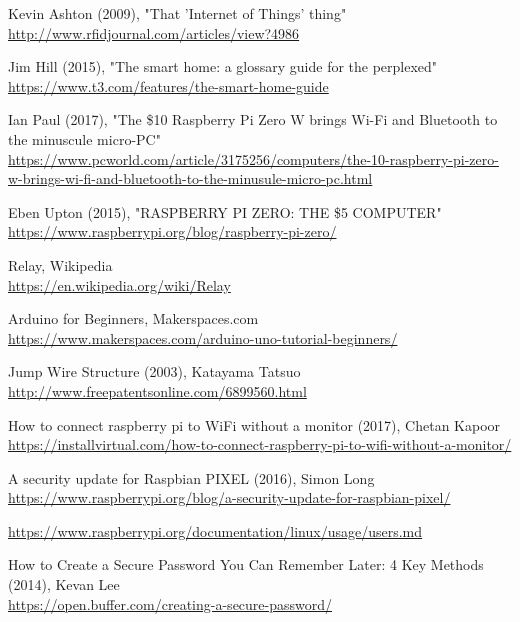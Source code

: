 \begin{thebibliography}{99}

Kevin Ashton (2009), "That 'Internet of Things' thing"\\
\url{http://www.rfidjournal.com/articles/view?4986}

Jim Hill (2015), "The smart home: a glossary guide for the perplexed"\\
\url{https://www.t3.com/features/the-smart-home-guide}

Ian Paul (2017), "The \$10 Raspberry Pi Zero W brings Wi-Fi and Bluetooth to the minuscule micro-PC"\\
\url{https://www.pcworld.com/article/3175256/computers/the-10-raspberry-pi-zero-w-brings-wi-fi-and-bluetooth-to-the-minusule-micro-pc.html}

Eben Upton (2015), "RASPBERRY PI ZERO: THE \$5 COMPUTER"\\
\url{https://www.raspberrypi.org/blog/raspberry-pi-zero/}

Relay, Wikipedia\\
\url{https://en.wikipedia.org/wiki/Relay}

Arduino for Beginners, Makerspaces.com\\
\url{https://www.makerspaces.com/arduino-uno-tutorial-beginners/}

Jump Wire Structure (2003), Katayama Tatsuo\\
\url{http://www.freepatentsonline.com/6899560.html}

How to connect raspberry pi to WiFi without a monitor (2017), Chetan Kapoor\\
\url{https://installvirtual.com/how-to-connect-raspberry-pi-to-wifi-without-a-monitor/}

A security update for Raspbian PIXEL (2016), Simon Long\\ 
\url{https://www.raspberrypi.org/blog/a-security-update-for-raspbian-pixel/}

\url{https://www.raspberrypi.org/documentation/linux/usage/users.md}

How to Create a Secure Password You Can Remember Later: 4 Key Methods (2014), Kevan Lee\\
\url{https://open.buffer.com/creating-a-secure-password/}


\end{thebibliography}
